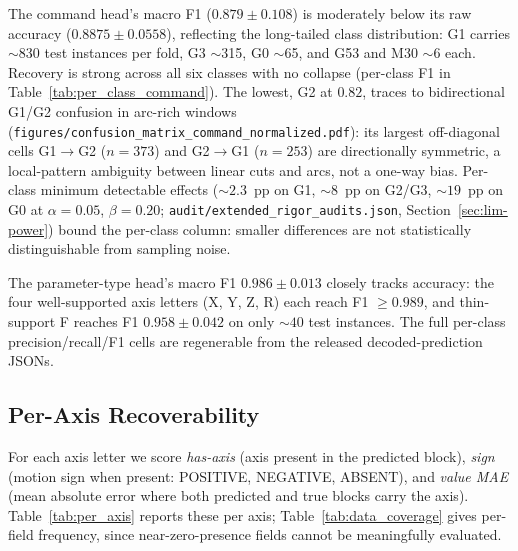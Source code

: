 \documentclass[sensors,article,submit,moreauthors,pdftex]{Definitions/mdpi}
\begin{document}




The command head's macro F1 ($0.879 \pm 0.108$) is moderately below its raw accuracy ($0.8875 \pm 0.0558$), reflecting the long-tailed class distribution: G1 carries $\sim$830 test instances per fold, G3 $\sim$315, G0 $\sim$65, and G53 and M30 $\sim$6 each. Recovery is strong across all six classes with no collapse (per-class F1 in Table~\ref{tab:per_class_command}). The lowest, G2 at $0.82$, traces to bidirectional G1/G2 confusion in arc-rich windows (\texttt{figures/confusion\_matrix\_command\_normalized.pdf}): its largest off-diagonal cells G1$\to$G2 ($n\!=\!373$) and G2$\to$G1 ($n\!=\!253$) are directionally symmetric, a local-pattern ambiguity between linear cuts and arcs, not a one-way bias. Per-class minimum detectable effects ($\sim$$2.3$~pp on G1, $\sim$$8$~pp on G2/G3, $\sim$$19$~pp on G0 at $\alpha\!=\!0.05$, $\beta\!=\!0.20$; \texttt{audit/extended\_rigor\_audits.json}, Section~\ref{sec:lim-power}) bound the per-class column: smaller differences are not statistically distinguishable from sampling noise.






The parameter-type head's macro F1 $0.986 \pm 0.013$ closely tracks accuracy: the four well-supported axis letters (X, Y, Z, R) each reach F1 $\ge\!0.989$, and thin-support F reaches F1 $0.958 \pm 0.042$ on only $\sim$$40$ test instances. The full per-class precision/recall/F1 cells are regenerable from the released decoded-prediction JSONs.

\subsection{Per-Axis Recoverability}
\label{sec:per-axis}

For each axis letter we score \emph{has-axis} (axis present in the predicted block), \emph{sign} (motion sign when present: POSITIVE, NEGATIVE, ABSENT), and \emph{value MAE} (mean absolute error where both predicted and true blocks carry the axis). Table~\ref{tab:per_axis} reports these per axis; Table~\ref{tab:data_coverage} gives per-field frequency, since near-zero-presence fields cannot be meaningfully evaluated.




\end{document}

